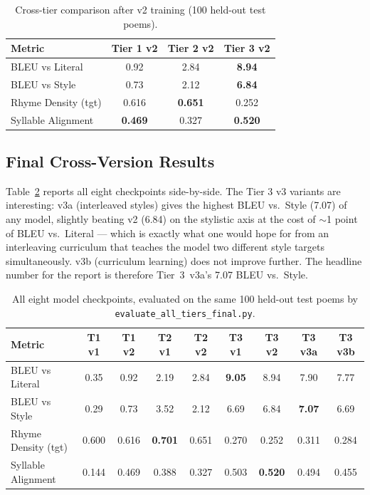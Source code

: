 \documentclass[11pt]{article}
\begin{document}
\begin{table}[h]
\centering
\caption{Cross-tier comparison after v2 training (100 held-out test poems).}
\label{tab:v2}
\begin{tabular}{lccc}
\toprule
\textbf{Metric} & \textbf{Tier 1 v2} & \textbf{Tier 2 v2} & \textbf{Tier 3 v2} \\
\midrule
BLEU vs Literal       & 0.92  & 2.84  & \textbf{8.94} \\
BLEU vs Style         & 0.73  & 2.12  & \textbf{6.84} \\
Rhyme Density (tgt)   & 0.616 & \textbf{0.651} & 0.252 \\
Syllable Alignment    & \textbf{0.469} & 0.327 & \textbf{0.520} \\
\bottomrule
\end{tabular}
\end{table}

\subsection{Final Cross-Version Results}
Table~\ref{tab:final} reports all eight checkpoints side-by-side. The Tier 3 v3 variants are interesting: v3a (interleaved styles) gives the highest BLEU vs.\ Style (7.07) of any model, slightly beating v2 (6.84) on the stylistic axis at the cost of $\sim$1 point of BLEU vs.\ Literal --- which is exactly what one would hope for from an interleaving curriculum that teaches the model two different style targets simultaneously. v3b (curriculum learning) does not improve further. The headline number for the report is therefore Tier~3~v3a's 7.07 BLEU vs.\ Style.

\begin{table}[h]
\centering
\caption{All eight model checkpoints, evaluated on the same 100 held-out test poems by \texttt{evaluate\_all\_tiers\_final.py}.}
\label{tab:final}
\small
\setlength{\tabcolsep}{4pt}
\begin{tabular}{lcccccccc}
\toprule
\textbf{Metric} & \textbf{T1 v1} & \textbf{T1 v2} & \textbf{T2 v1} & \textbf{T2 v2} & \textbf{T3 v1} & \textbf{T3 v2} & \textbf{T3 v3a} & \textbf{T3 v3b} \\
\midrule
BLEU vs Literal      & 0.35  & 0.92  & 2.19  & 2.84  & \textbf{9.05}  & 8.94  & 7.90  & 7.77  \\
BLEU vs Style        & 0.29  & 0.73  & 3.52  & 2.12  & 6.69  & 6.84  & \textbf{7.07}  & 6.69  \\
Rhyme Density (tgt)  & 0.600 & 0.616 & \textbf{0.701} & 0.651 & 0.270 & 0.252 & 0.311 & 0.284 \\
Syllable Alignment   & 0.144 & 0.469 & 0.388 & 0.327 & 0.503 & \textbf{0.520} & 0.494 & 0.455 \\
\bottomrule
\end{tabular}
\end{table}
\end{document}
